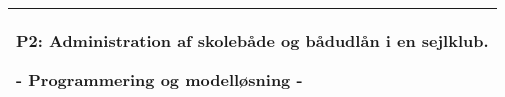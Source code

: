 


%
%
%
%
\thispagestyle{empty}
%
  \addtolength{\hoffset}{0.5\evensidemargin-0.5\oddsidemargin} %
  \noindent%
  \begin{tabular}{@{}p{\textwidth}@{}}
    \toprule[2pt]
    \midrule
    \vspace{0.2cm}
    \begin{center}
    \Huge{\textbf{
      P2: Administration af skolebåde og bådudlån i en sejlklub.%
    }}
    \end{center}
    \begin{center}
      \Large{
        - Programmering og modelløsning -%
      }
    \end{center}
    \vspace{0.2cm}\\
    \midrule
    \toprule[2pt]
  \end{tabular}
  \vspace{4 cm}
